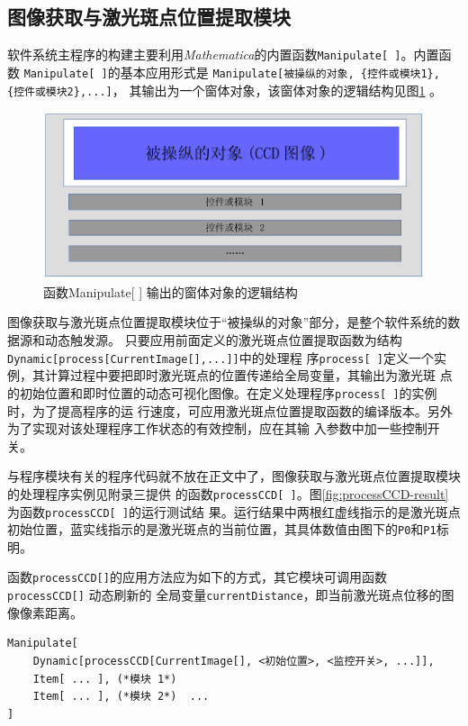 \documentclass[UTF8,a4paper,12pt]{article}
\begin{document}
\subsection{图像获取与激光斑点位置提取模块}
软件系统主程序的构建主要利用\textit{Mathematica}的内置函数\verb|Manipulate[ ]|。内置函数
\verb|Manipulate[ ]|的基本应用形式是
\verb|Manipulate[被操纵的对象, {控件或模块1}, {控件或模块2},...]|，
其输出为一个窗体对象，该窗体对象的逻辑结构见图\;\ref{fig:manipulate} 。

\begin{figure}[htbp]
\centering
\includegraphics[width=130mm]{image/manipulate.pdf}
\caption{函数Manipulate[ ] 输出的窗体对象的逻辑结构}\label{fig:manipulate}
\end{figure}

图像获取与激光斑点位置提取模块位于``被操纵的对象''部分，是整个软件系统的数据源和动态触发源。
只要应用前面定义的激光斑点位置提取函数为结构\verb|Dynamic[process[CurrentImage[],...]]|中的处理程
序\verb|process[ ]|定义一个实例，其计算过程中要把即时激光斑点的位置传递给全局变量，其输出为激光斑
点的初始位置和即时位置的动态可视化图像。在定义处理程序\verb|process[ ]|的实例时，为了提高程序的运
行速度，可应用激光斑点位置提取函数的编译版本。另外为了实现对该处理程序工作状态的有效控制，应在其输
入参数中加一些控制开关。

与程序模块有关的程序代码就不放在正文中了，图像获取与激光斑点位置提取模块的处理程序实例见附录三提供
的函数\verb|processCCD[ ]|。图\;\ref{fig:processCCD-result} 为函数\verb|processCCD[ ]|的运行测试结
果。运行结果中两根红虚线指示的是激光斑点
初始位置，蓝实线指示的是激光斑点的当前位置，其具体数值由图下的\verb|P0|和\verb|P1|标明。

函数\verb|processCCD[]|的应用方法应为如下的方式，其它模块可调用函数\verb|processCCD[]| 动态刷新的
全局变量\verb|currentDistance|，即当前激光斑点位移的图像像素距离。
\begin{verbatim}
Manipulate[
    Dynamic[processCCD[CurrentImage[], <初始位置>, <监控开关>, ...]],
    Item[ ... ], (*模块 1*)
    Item[ ... ], (*模块 2*)  ...
]
\end{verbatim}
\end{document}
